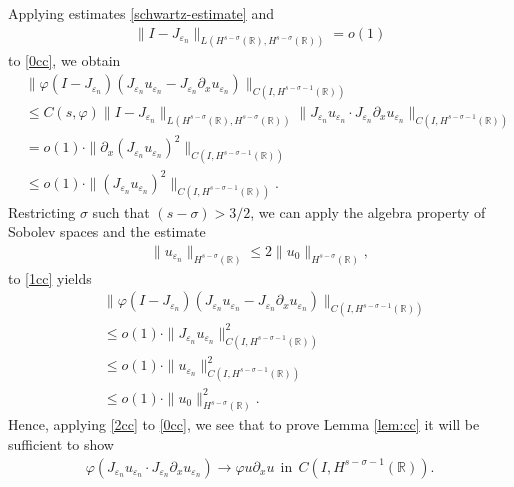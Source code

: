 \documentclass[12pt,reqno]{amsart}
\newcommand{\rr}{\mathbb{R}}
\newcommand{\p}{\partial}
\newcommand{\ee}{\varepsilon}
\newcommand{\vp}{\varphi}
\theoremstyle{plain}  %
\theoremstyle{definition}
\begin{document}
		Applying estimates \eqref{schwartz-estimate} and
		\begin{equation*}
			\begin{split}
				\|I - J_{\ee_n} \|_{L(H^{s-\sigma}(\rr),
				H^{s-\sigma}(\rr))} = o(1)
			\end{split}
		\end{equation*}
		to \eqref{0cc}, we obtain
		\begin{equation}
			\begin{split}
				& \|\vp (I-J_{\ee_n}) (J_{\ee_n} u_{\ee_n} - J_{\ee_n}
				\p_x u_{\ee_n}) \|_{C(I, H^{s-\sigma -1}(\rr))}
				\\
				& \le C(s, \vp) \|I-J_{\ee_n}\|_{L(H^{s-\sigma}(\rr), H^{s-
				\sigma}(\rr))} \|J_{\ee_n} u_{\ee_n} \cdot J_{\ee_n} \p_x
				u_{\ee_n} \|_{C(I, H^{s-\sigma -1}(\rr))}
				\\
				& = o(1) \cdot
				\|\p_x (J_{\ee_n} u_{\ee_n})^2 \|_{C(I, H^{s-\sigma
				-1}(\rr))}
				\\
				& \le o(1) \cdot
				\|(J_{\ee_n} u_{\ee_n})^2 \|_{C(I, H^{s-\sigma -1}(\rr))}.
				\label{1cc}
			\end{split}
		\end{equation}
		Restricting $\sigma$ such that $(s - \sigma) > 3/2$, we can apply
		the algebra property of Sobolev spaces and the estimate
		\begin{equation*}
			\begin{split}
				\|u_{\ee_n} \|_{H^{s-\sigma}(\rr)} \le 2
				\|u_0\|_{H^{s-\sigma}(\rr)}, 
			\end{split}
		\end{equation*}
		to \eqref{1cc} yields
		\begin{equation}
			\begin{split}
				& \|\vp (I-J_{\ee_n}) (J_{\ee_n} u_{\ee_n} - J_{\ee_n}
				\p_x u_{\ee_n}) \|_{C(I, H^{s-\sigma -1}(\rr))}
				\\
				& \le o(1)\cdot  \|J_{\ee_n} u_{\ee_n} \|^2_{C(I, H^{s-\sigma -1}(\rr))}
				\\
				& \le o(1)\cdot  \|u_{\ee_n} \|_{C(I, H^{s-\sigma -1}(\rr))}^2
				\\
				& \le o(1)\cdot \|u_0\|_{H^{s-\sigma}(\rr)}^2.
				\label{2cc}
			\end{split}
		\end{equation}
		Hence, applying \eqref{2cc} to \eqref{0cc}, we see that to prove
		Lemma \ref{lem:cc} it will be sufficient to
		show
		\begin{equation}
			\label{3cc}
			\begin{split}
				\vp(J_{\ee_n} u_{\ee_n} \cdot J_{\ee_n} \p_x u_{\ee_n}) \to \vp u
				\p_x u \ \ \text{in} \ \ C(I, H^{s-\sigma -1}(\rr)).
			\end{split}
		\end{equation}
\end{document}
